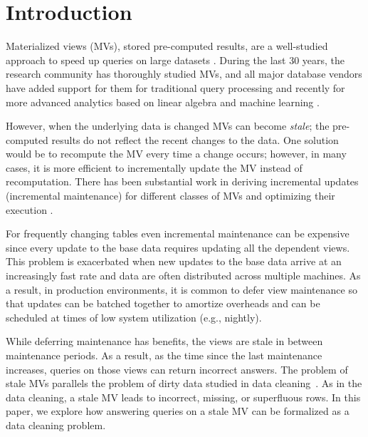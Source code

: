 \vspace{-0.5em}
\section{Introduction}
Materialized views (MVs), stored pre-computed results, are a well-studied approach to speed up queries on large datasets \cite{LarsonY85, gupta1995maintenance, chirkova2011materialized, halevy2001answering}.
During the last 30 years, the research community has thoroughly studied MVs, and all major database vendors have added support for them for traditional query processing and recently for more advanced analytics based on linear algebra and machine learning \cite{nikolic2014linview, zhang2014mat}.

However, when the underlying data is changed MVs can become \emph{stale}; the pre-computed results do not reflect the recent changes to the data. 
One solution would be to recompute the MV every time a change occurs; however, in many cases, it is more efficient to incrementally update the MV instead of recomputation.
There has been substantial work in deriving incremental updates (incremental maintenance) for different classes of MVs and optimizing their execution \cite{chirkova2011materialized}.

For frequently changing tables even incremental maintenance can be expensive since every update to the base data requires updating all the dependent views.  
This problem is exacerbated when new updates to the base data arrive at an increasingly fast rate and data are often distributed across multiple machines.  
As a result, in production environments, it is common to defer view maintenance \cite{chirkova2011materialized, zhou2007lazy, DBLP:conf/sigmod/ColbyGLMT96} so that updates can be batched together to amortize overheads and can be scheduled at times of low system utilization (e.g., nightly).  

While deferring maintenance has benefits, the views are stale in between maintenance periods. 
As a result, as the time since the last maintenance increases, queries on those views can return incorrect answers.
The problem of stale MVs parallels the problem of dirty data studied in data cleaning~\cite{rahm2000data}.
As in the data cleaning, a stale MV leads to incorrect, missing, or superfluous rows.
In this paper, we explore how answering queries on a stale MV can be formalized as a data cleaning problem. 

